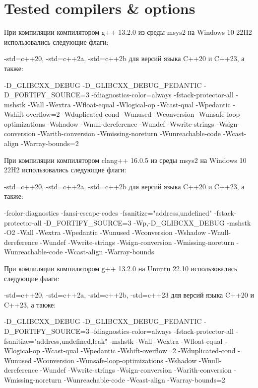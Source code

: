 \documentclass{report}
\begin{document}
\pagebreak

\section*{Tested compilers \& options}

При компиляции компилятором g++ 13.2.0 из среды msys2 на Windows 10 22H2 использовались следующие флаги:

-std=c++20, -std=c++2a, -std=c++2b для версий языка C++20 и C++23, а также:

\begin{cppcode}
-D_GLIBCXX_DEBUG
-D_GLIBCXX_DEBUG_PEDANTIC
-D_FORTIFY_SOURCE=3
-fdiagnostics-color=always
-fstack-protector-all
-mshstk
-Wall
-Wextra
-Wfloat-equal
-Wlogical-op
-Wcast-qual
-Wpedantic
-Wshift-overflow=2
-Wduplicated-cond
-Wunused -Wconversion
-Wunsafe-loop-optimizations
-Wshadow
-Wnull-dereference
-Wundef 
-Wwrite-strings
-Wsign-conversion
-Warith-conversion
-Wmissing-noreturn
-Wunreachable-code
-Wcast-align
-Warray-bounds=2
\end{cppcode}

При компиляции компилятором clang++ 16.0.5 из среды msys2 на Windows 10 22H2 использовались следующие флаги:

-std=c++20, -std=c++2a, -std=c++2b для версий языка C++20 и C++23, а также:

\begin{cppcode}
-fcolor-diagnostics
-fansi-escape-codes
-fsanitize="address,undefined"
-fstack-protector-all
-D_FORTIFY_SOURCE=3
-Wp,-D_GLIBCXX_DEBUG
-mshstk
-O2
-Wall
-Wextra
-Wpedantic
-Wunused
-Wconversion
-Wshadow
-Wnull-dereference
-Wundef
-Wwrite-strings
-Wsign-conversion
-Wmissing-noreturn
-Wunreachable-code
-Wcast-align
-Warray-bounds
\end{cppcode}

При компиляции компилятором g++ 13.2.0 на Ununtu 22.10 использовались следующие флаги:

-std=c++20, -std=c++2a, -std=c++2b, -std=c++23 для версий языка C++20 и C++23, а также:

\begin{cppcode}
-D_GLIBCXX_DEBUG
-D_GLIBCXX_DEBUG_PEDANTIC
-D_FORTIFY_SOURCE=3
-fdiagnostics-color=always
-fstack-protector-all
-fsanitize="address,undefined,leak"
-mshstk
-Wall
-Wextra
-Wfloat-equal
-Wlogical-op
-Wcast-qual
-Wpedantic
-Wshift-overflow=2
-Wduplicated-cond
-Wunused -Wconversion
-Wunsafe-loop-optimizations
-Wshadow
-Wnull-dereference
-Wundef 
-Wwrite-strings
-Wsign-conversion
-Warith-conversion
-Wmissing-noreturn
-Wunreachable-code
-Wcast-align
-Warray-bounds=2
\end{cppcode}
\end{document}
